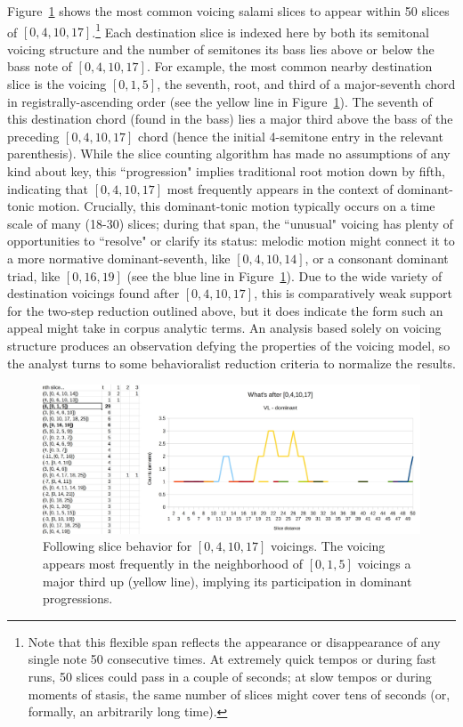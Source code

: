 Figure~\ref{[0,4,10,17]} shows the most common voicing salami slices to appear within 50 slices of $[0,4,10,17]$.\footnote{Note that this flexible span reflects the appearance or disappearance of any single note 50 consecutive times.  At extremely quick tempos or during fast runs, 50 slices could pass in a couple of seconds; at slow tempos or during moments of stasis, the same number of slices might cover tens of seconds (or, formally, an arbitrarily long time).}  Each destination slice is indexed here by both its semitonal voicing structure and the number of semitones its bass lies above or below the bass note of $[0,4,10,17]$.  For example, the most common nearby destination slice is the voicing $[0,1,5]$, the seventh, root, and third of a major-seventh chord in registrally-ascending order (see the yellow line in Figure~\ref{[0,4,10,17]}). The seventh of this destination chord (found in the bass) lies a major third above the bass of the preceding $[0,4,10,17]$ chord (hence the initial 4-semitone entry in the relevant parenthesis).  While the slice counting algorithm has made no assumptions of any kind about key, this ``progression" implies traditional root motion down by fifth, indicating that $[0,4,10,17]$ most frequently appears in the context of dominant-tonic motion.  Crucially, this dominant-tonic motion typically occurs on a time scale of many (18-30) slices; during that span, the ``unusual" voicing has plenty of opportunities to ``resolve" or clarify its status: melodic motion might connect it to a more normative dominant-seventh, like $[0,4,10,14]$, or a consonant dominant triad, like $[0,16,19]$ (see the blue line in Figure~\ref{[0,4,10,17]}).  Due to the wide variety of destination voicings found after $[0,4,10,17]$, this is comparatively weak support for the two-step reduction outlined above, but it does indicate the form such an appeal might take in corpus analytic terms.  An analysis based solely on voicing structure produces an observation defying the properties of the voicing model, so the analyst turns to some behavioralist reduction criteria to normalize the results.

\begin{figure}
	\centering
	\includegraphics[width=6.5in]{041017_behavior.jpg}
	\caption{Following slice behavior for $[0,4,10,17]$ voicings.  The voicing appears most frequently in the neighborhood of $[0,1,5]$ voicings a major third up (yellow line), implying its participation in dominant progressions.}
	\label{[0,4,10,17]}
\end{figure}

